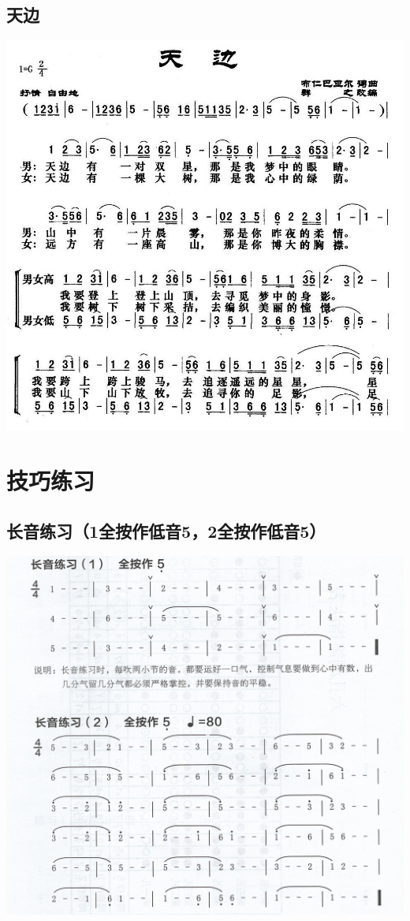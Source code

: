 \documentclass[cn,pad,chinese,chinesefont=nofont]{elegantbook}
\begin{document}
\section{天边}
    \includegraphics[width=\textwidth]{dongxiao/20200324天边.jpg}


\chapter{技巧练习}
\section{长音练习（1全按作低音5，2全按作低音5）}
\includegraphics[width=\textwidth]{dongxiao/Scan 7.jpeg}
\end{document}

